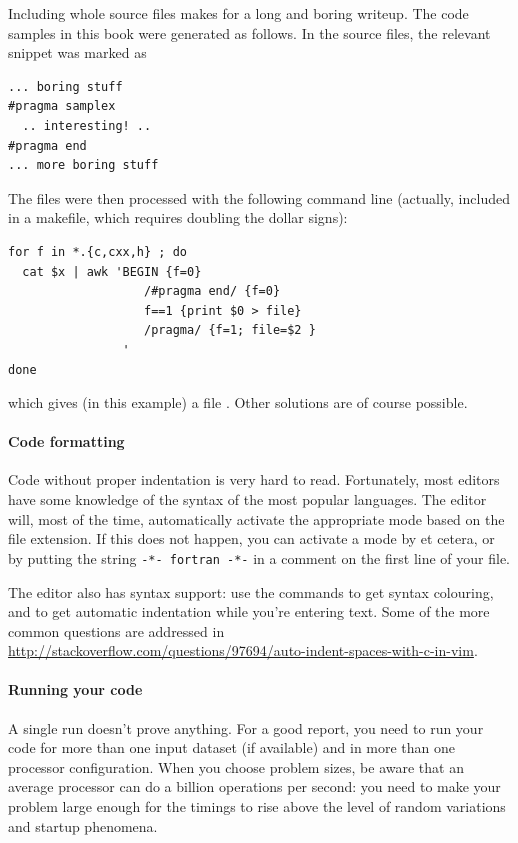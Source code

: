 Including whole source files makes for a long and boring writeup. The code samples in this
book were generated as follows. In the source files, the relevant snippet was marked as
\begin{verbatim}
... boring stuff
#pragma samplex
  .. interesting! ..
#pragma end
... more boring stuff
\end{verbatim}
The files were then processed with the following command line (actually, included
in a makefile, which requires doubling the dollar signs):
\begin{verbatim}
for f in *.{c,cxx,h} ; do
  cat $x | awk 'BEGIN {f=0}
                   /#pragma end/ {f=0}
                   f==1 {print $0 > file}
                   /pragma/ {f=1; file=$2 }
                '
done
\end{verbatim}
which gives (in this example) a file . Other solutions are of course possible.

\paragraph*{\bf Code formatting}

Code without proper indentation is very hard to read. Fortunately,
most editors have some knowledge of the syntax of the most popular
languages. The  editor will, most of the time,
automatically activate the appropriate mode based on the file
extension. If this does not happen, you can activate a mode by  et cetera, or by putting the string
\verb+-*- fortran -*-+ in a comment on the first line of your file.

The  editor also has syntax support: use the commands
 to get syntax colouring, and  to get
automatic indentation while you're entering text. Some of the more
common questions are addressed in
\url{http://stackoverflow.com/questions/97694/auto-indent-spaces-with-c-in-vim}.

\paragraph*{\bf Running your code}

A single run doesn't prove anything. For a good report, you need to
run your code for more than one input dataset (if available) and in
more than one processor configuration. When you choose problem sizes,
be aware that an average processor can do a billion operations per
second: you need to make your problem large enough for the timings to
rise above the level of random variations and startup phenomena.

